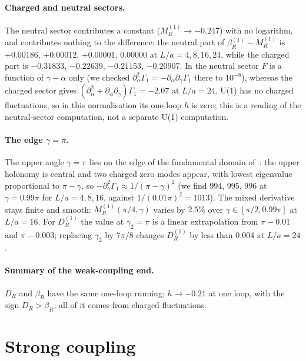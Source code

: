 \documentclass[11pt,a4paper]{article}
\theoremstyle{definition}
\theoremstyle{remark}
\newcommand{\bR}{\beta_R}
\newcommand{\DR}{D_R}
\begin{document}
\paragraph{Charged and neutral sectors.} The neutral sector contributes a constant ($M_R^{(1)}\to-0.247$) with no logarithm, and contributes nothing to the difference: the neutral part of $\bR^{(1)}-M_R^{(1)}$ is $+0.00186$, $+0.00012$, $+0.00001$, $0.00000$ at $L/a=4,8,16,24$, while the charged part is $-0.31833$, $-0.22639$, $-0.21153$, $-0.20907$. In the neutral sector $F$ is a function of $\gamma-\alpha$ only (we checked $\partial_\alpha^2\Gamma_1=-\partial_\alpha\partial_\gamma\Gamma_1$ there to $10^{-8}$), whereas the charged sector gives $(\partial_\alpha^2+\partial_\alpha\partial_\gamma)\Gamma_1=-2.07$ at $L/a=24$. U(1) has no charged fluctuations, so in this normalisation its one-loop $h$ is zero; this is a reading of the neutral-sector computation, not a separate U(1) computation.

\paragraph{The edge $\gamma=\pi$.} The upper angle $\gamma=\pi$ lies on the edge of the fundamental domain of~\cite[(5.8)]{LNWW}: the upper holonomy is central and two charged zero modes appear, with lowest eigenvalue proportional to $\pi-\gamma$, so $-\partial_\gamma^2\Gamma_1\approx1/(\pi-\gamma)^2$ (we find $994$, $995$, $996$ at $\gamma=0.99\pi$ for $L/a=4,8,16$, against $1/(0.01\pi)^2=1013$). The mixed derivative stays finite and smooth: $M_R^{(1)}(\pi/4,\gamma)$ varies by $2.5\%$ over $\gamma\in[\pi/2,0.99\pi]$ at $L/a=16$. For $\DR^{(1)}$ the value at $\gamma_2=\pi$ is a linear extrapolation from $\pi-0.01$ and $\pi-0.003$; replacing $\gamma_2$ by $7\pi/8$ changes $\DR^{(1)}$ by less than $0.004$ at $L/a=24$.

\paragraph{Summary of the weak-coupling end.} $\DR$ and $\bR$ have the same one-loop running; $h\to-0.21$ at one loop, with the sign $\DR>\bR$; all of it comes from charged fluctuations.

\section{Strong coupling}\label{sec:strong}
\end{document}
